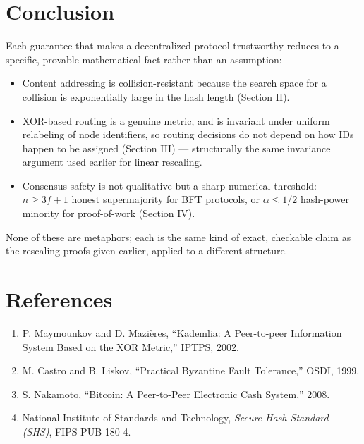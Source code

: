 \documentclass[10pt,journal,compsoc]{IEEEtran}
\begin{document}
\section{Conclusion}
Each guarantee that makes a decentralized protocol trustworthy reduces to a specific, provable mathematical fact rather than an assumption:
\begin{itemize}
    \item Content addressing is collision-resistant because the search space for a collision is exponentially large in the hash length (Section II).
    \item XOR-based routing is a genuine metric, and is invariant under uniform relabeling of node identifiers, so routing decisions do not depend on how IDs happen to be assigned (Section III) — structurally the same invariance argument used earlier for linear rescaling.
    \item Consensus safety is not qualitative but a sharp numerical threshold: $n\ge 3f+1$ honest supermajority for BFT protocols, or $\alpha \le 1/2$ hash-power minority for proof-of-work (Section IV).
\end{itemize}
None of these are metaphors; each is the same kind of exact, checkable claim as the rescaling proofs given earlier, applied to a different structure.

\section*{References}
\begin{small}
\begin{enumerate}
    \item P. Maymounkov and D. Mazières, ``Kademlia: A Peer-to-peer Information System Based on the XOR Metric,'' IPTPS, 2002.
    \item M. Castro and B. Liskov, ``Practical Byzantine Fault Tolerance,'' OSDI, 1999.
    \item S. Nakamoto, ``Bitcoin: A Peer-to-Peer Electronic Cash System,'' 2008.
    \item National Institute of Standards and Technology, \textit{Secure Hash Standard (SHS)}, FIPS PUB 180-4.
\end{enumerate}
\end{small}
\end{document}
